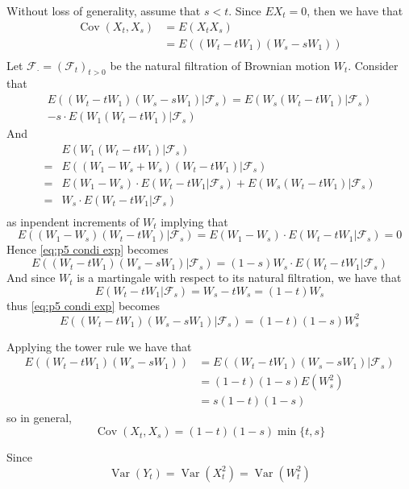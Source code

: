 \documentclass{homework}
\DeclareMathOperator{\var}{Var}
\DeclareMathOperator{\cov}{Cov}
\begin{document}
    \problem

    \problem
    \begin{subproblem}
        \item
        Without loss of generality, assume that $s<t$.
        Since $EX_t=0$, then we have that
        \[\begin{aligned}
            \cov(X_t,X_s)&=E(X_tX_s)\\
            &=E((W_t-tW_1)(W_s-sW_1))\\
        \end{aligned}\]
        Let $\mathcal F_\cdot=(\mathcal F_t)_{t>0}$ be
        the natural filtration of Brownian motion
        $W_t$. Consider that
        \begin{multline}
            \label{eq:p5 condi exp}
            E((W_t-tW_1)(W_s-sW_1)|\mathcal F_s)
            =E(W_s(W_t-tW_1)|\mathcal F_s)\\
            -s\cdot E(W_1(W_t-tW_1)|\mathcal F_s)
        \end{multline}
        And
        \begin{equation}
            \label{eq:p5 condi exp part}
            \begin{aligned}
                &E(W_1(W_t-tW_1)|\mathcal F_s)\\
                =&E((W_1-W_s+W_s)(W_t-tW_1)|\mathcal F_s)\\
                =&E(W_1-W_s)\cdot E(W_t-tW_1|\mathcal F_s)
                +E(W_s(W_t-tW_1)|\mathcal F_s)\\
                =&W_s\cdot E(W_t-tW_1|\mathcal F_s)\\
            \end{aligned}
        \end{equation}
        as inpendent increments of $W_t$ implying that
        \[E((W_1-W_s)(W_t-tW_1)|\mathcal F_s)
        =E(W_1-W_s)\cdot E(W_t-tW_1|\mathcal F_s)=0\]
        Hence \cref{eq:p5 condi exp} becomes
        \[E((W_t-tW_1)(W_s-sW_1)|\mathcal F_s)
        =(1-s)W_s\cdot E(W_t-tW_1|\mathcal F_s)\]
        And since
        $W_t$ is a martingale with respect to its natural filtration,
        we have that
        \[E(W_t-tW_1|\mathcal F_s)=W_s-tW_s=(1-t)W_s\]
        thus \cref{eq:p5 condi exp} becomes
        \[E((W_t-tW_1)(W_s-sW_1)|\mathcal F_s)=(1-t)(1-s)W_s^2\]
        
        Applying the tower rule we have that
        \[\begin{aligned}
            E((W_t-tW_1)(W_s-sW_1))&=E((W_t-tW_1)(W_s-sW_1)|\mathcal F_s)\\
            &=(1-t)(1-s)E(W_s^2)\\
            &=s(1-t)(1-s)
        \end{aligned}\]
        so in general,
        \[\cov(X_t,X_s)=(1-t)(1-s)\min\{t,s\}\]

        \item
        Since
        \[\var(Y_t)=\var(X_t^2)=\var(W_t^2)\]        
    \end{subproblem}
\end{document}
